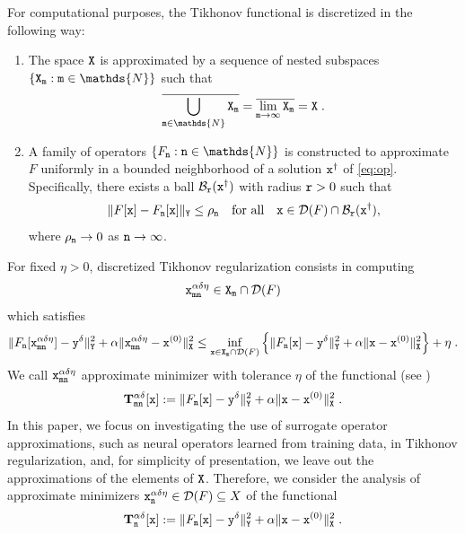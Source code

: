 \documentclass[10pt]{article}
\numberwithin{equation}{section}
\theoremstyle{nonumberplain}
\newcommand{\N}{\mathds{N}}
\newcommand{\norms}[1]{\|#1\|}
\newcommand{\set}[1]{\left\{#1\right\}}
\newcommand{\X}{{\tt X}}
\newcommand{\Y}{{\tt Y}}
\newcommand{\y}{{\tt y}}
\newcommand{\yd}{\y^\delta}
\newcommand{\m}{{\tt m}}
\newcommand{\n}{{\tt n}}
\newcommand{\x}{{\tt x}}
\newcommand{\xad}{\x^{\alpha\delta\eta}}
\newcommand{\xdad}{\xad_{\m\n}}
\newcommand{\xdag}{\x^\dagger}
\newcommand{\Tik}{\mathbf{T}}
\begin{document}
For computational purposes, the Tikhonov functional is discretized in the following way:
\begin{enumerate}
	\item The space $\X$ is approximated by a sequence of nested subspaces $\set{\X_\m : \m \in \N}$ such that 
	\begin{equation*}
		\overline{\bigcup_{\m \in \N} \X_\m} = \overline{\lim_{\m \to \infty} \X_\m} = \X\;.
	\end{equation*} 
    \item A family of operators $\set{F_\n: \n \in \N}$ is constructed to approximate $F$ uniformly in a bounded neighborhood of a solution $\xdag$ of \autoref{eq:op}. Specifically, there exists a ball $\mathcal{B}_{\tt r}(\xdag)$ with radius ${ \tt r} > 0$ such that
    \begin{equation} \label{eq:unifrom}
       \norms{F[\x] - F_\n[\x]}_\Y \leq \rho_\n \quad \text{for all} \quad \x \in \mathcal{D}(F) \cap \mathcal{B}_{\tt r}(\xdag),
    \end{equation}
    where $\rho_\n \to 0$ as $\n \to \infty$. 
\end{enumerate}


For fixed $\eta > 0$, discretized Tikhonov regularization consists in computing 
\begin{equation} \label{eq:xdad} 
	\xdad \in \X_\m \cap \mathcal{D}(F)
\end{equation}
which satisfies 
\begin{equation} \label{eq:eta}
\norms{F_\n[\xdad]-\yd}_\Y^2 + \alpha\norms{\xdad-\x^{(0)}}_\X^2 \leq \inf_{\x \in \X_\m \cap \mathcal{D}(F)} \set{
   \norms{F_\n[\x]-\yd}_\Y^2 + \alpha\norms{\x-\x^{(0)}}_\X^2} + \eta\;.
\end{equation} 
We call $\xdad$ approximate minimizer with tolerance $\eta$ of the functional (see \cite{NeuSch90,PoeResSch10})
\begin{equation} \label{eq:discTik}
	\Tik_{\m\n}^{\alpha\delta}[\x] :=
		\norms{F_\n[\x]-\yd}_\Y^2 + \alpha\norms{\x-\x^{(0)}}_\X^2\;.
\end{equation}
In this paper, we focus on investigating the use of surrogate operator approximations, such as neural operators learned from training data, in Tikhonov regularization, and, for simplicity of presentation, we leave out the approximations of the elements of $\X$. Therefore, we consider the analysis of approximate minimizers $\x_\n^{\alpha\delta\eta} \in \mathcal{D}(F) \subseteq X$ of the functional  
\begin{equation} \label{eq:discTik_s}
	\Tik_{\n}^{\alpha\delta}[\x] := \norms{F_\n[\x]-\yd}_\Y^2 + \alpha\norms{\x-\x^{(0)}}_\X^2\;.
\end{equation}
\end{document}
